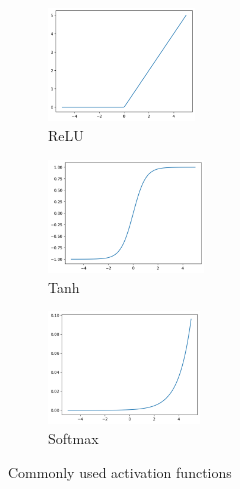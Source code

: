 \begin{figure}[H]
  \centering
  \begin{subfigure}{0.27\linewidth}
    \includegraphics[height=3cm]{figures/images/relu.png}
    \caption{ReLU}
  \end{subfigure}
  \hfill
  \begin{subfigure}{0.28\linewidth}
    \includegraphics[height=3cm]{figures/images/tanh.png}
    \caption{Tanh}
  \end{subfigure}
  \hfill
  \begin{subfigure}{0.28\linewidth}
    \includegraphics[height=3cm]{figures/images/softmax.png}
    \caption{Softmax}
  \end{subfigure}
  \caption[Activation functions]{Commonly used activation functions}
  \label{fig:activation_functions}
\end{figure}
